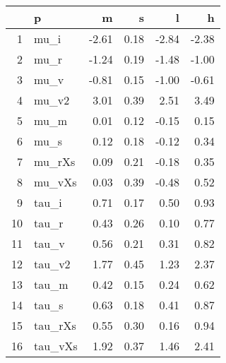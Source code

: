 \begin{table}[ht]
\centering
\begin{tabular}{rlrrrr}
  \hline
 & p & m & s & l & h \\ 
  \hline
1 & mu\_i & -2.61 & 0.18 & -2.84 & -2.38 \\ 
  2 & mu\_r & -1.24 & 0.19 & -1.48 & -1.00 \\ 
  3 & mu\_v & -0.81 & 0.15 & -1.00 & -0.61 \\ 
  4 & mu\_v2 & 3.01 & 0.39 & 2.51 & 3.49 \\ 
  5 & mu\_m & 0.01 & 0.12 & -0.15 & 0.15 \\ 
  6 & mu\_s & 0.12 & 0.18 & -0.12 & 0.34 \\ 
  7 & mu\_rXs & 0.09 & 0.21 & -0.18 & 0.35 \\ 
  8 & mu\_vXs & 0.03 & 0.39 & -0.48 & 0.52 \\ 
  9 & tau\_i & 0.71 & 0.17 & 0.50 & 0.93 \\ 
  10 & tau\_r & 0.43 & 0.26 & 0.10 & 0.77 \\ 
  11 & tau\_v & 0.56 & 0.21 & 0.31 & 0.82 \\ 
  12 & tau\_v2 & 1.77 & 0.45 & 1.23 & 2.37 \\ 
  13 & tau\_m & 0.42 & 0.15 & 0.24 & 0.62 \\ 
  14 & tau\_s & 0.63 & 0.18 & 0.41 & 0.87 \\ 
  15 & tau\_rXs & 0.55 & 0.30 & 0.16 & 0.94 \\ 
  16 & tau\_vXs & 1.92 & 0.37 & 1.46 & 2.41 \\ 
   \hline
\end{tabular}
\label{tab:param}
\end{table}
